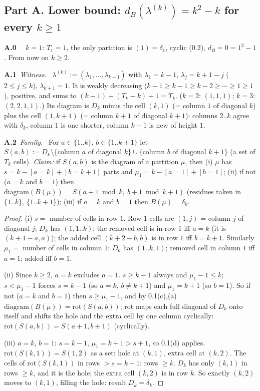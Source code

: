 \documentclass[11pt]{article}
\newcommand{\step}[2]{\par\medskip\noindent\textbf{#1}\ \textit{#2}\ }
\newcommand{\dB}{d_B}
\newcommand{\rot}{\mathrm{rot}}
\newcommand{\Iv}[1]{[#1]}
\begin{document}
\subsection*{Part A. Lower bound: $\dB(\lambda^{(k)})=k^2-k$ for every $k\ge1$}

\step{A.0}{} $k=1$: $T_1=1$, the only partition is $(1)=\delta_1$, cyclic (0.2), $\dB=0=1^2-1$. From now on $k\ge2$.

\step{A.1}{Witness.} $\lambda^{(k)}:=(\lambda_1,\ldots,\lambda_{k+1})$ with $\lambda_1=k-1$, $\lambda_j=k+1-j$ ($2\le j\le k$), $\lambda_{k+1}=1$. It is weakly decreasing ($k-1\ge k-1\ge k-2\ge\cdots\ge1\ge1$), positive, and sums to $(k-1)+(T_k-k)+1=T_k$. ($k=2$: $(1,1,1)$; $k=3$: $(2,2,1,1)$.)
Its diagram is $D_k$ minus the cell $(k,1)$ (= column $1$ of diagonal $k$) plus the cell $(1,k+1)$ (= column $k+1$ of diagonal $k+1$): columns $2..k$ agree with $\delta_k$, column $1$ is one shorter, column $k+1$ is new of height $1$.

\step{A.2}{Family.} For $a\in\{1..k\}$, $b\in\{1..k+1\}$ let $S(a,b):=D_k\setminus\{\text{column }a\text{ of diagonal }k\}\cup\{\text{column }b\text{ of diagonal }k+1\}$ (a set of $T_k$ cells).
\emph{Claim:} if $S(a,b)$ is the diagram of a partition $\mu$, then
(i) $\mu$ has $s=k-\Iv{a=k}+\Iv{b=k+1}$ parts and $\mu_1=k-\Iv{a=1}+\Iv{b=1}$;
(ii) if not ($a=k$ and $b=1$) then $\mathrm{diagram}(B(\mu))=S(a+1\bmod k,\ b+1\bmod k+1)$ (residues taken in $\{1..k\}$, $\{1..k+1\}$);
(iii) if $a=k$ and $b=1$ then $B(\mu)=\delta_k$.
\begin{proof}
(i) $s=$ number of cells in row $1$. Row-1 cells are $(1,j)$ = column $j$ of diagonal $j$; $D_k$ has $(1,1..k)$; the removed cell is in row $1$ iff $a=k$ (it is $(k+1-a,a)$); the added cell $(k+2-b,b)$ is in row $1$ iff $b=k+1$. Similarly $\mu_1=$ number of cells in column $1$: $D_k$ has $(1..k,1)$; removed cell in column $1$ iff $a=1$; added iff $b=1$.

(ii) Since $k\ge2$, $a=k$ excludes $a=1$. $s\ge k-1$ always and $\mu_1-1\le k$; $s<\mu_1-1$ forces $s=k-1$ (so $a=k$, $b\ne k+1$) and $\mu_1=k+1$ (so $b=1$). So if not ($a=k$ and $b=1$) then $s\ge\mu_1-1$, and by 0.1(c),(a) $\mathrm{diagram}(B(\mu))=\rot(S(a,b))$; $\rot$ maps each full diagonal of $D_k$ onto itself and shifts the hole and the extra cell by one column cyclically: $\rot(S(a,b))=S(a+1,b+1)$ (cyclically).

(iii) $a=k$, $b=1$: $s=k-1$, $\mu_1=k+1>s+1$, so 0.1(d) applies. $\rot(S(k,1))=S(1,2)$ as a set: hole at $(k,1)$, extra cell at $(k,2)$. The cells of $\rot(S(k,1))$ in rows $>s=k-1$: rows $\ge k$. $D_k$ has only $(k,1)$ in rows $\ge k$, and it is the hole; the extra cell $(k,2)$ is in row $k$. So exactly $(k,2)$ moves to $(k,1)$, filling the hole: result $D_k=\delta_k$.
\end{proof}
\end{document}
